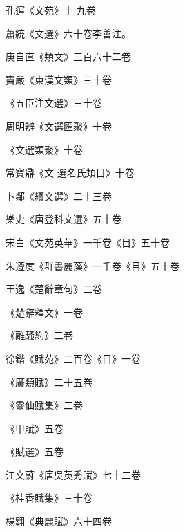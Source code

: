 
\begin{pinyinscope}

 孔逭《文苑》十
 九卷



 蕭統《文選》六十卷李善注。



 庚自直《類文》三百六十二卷



 竇嚴《東漢文類》三十卷



 《五臣注文選》三十卷



 周明辨《文選匯聚》十卷



 《文選類聚》十卷



 常寶鼎《文
 選名氏類目》十卷



 卜鄰《續文選》二十三卷



 樂史《唐登科文選》五十卷



 宋白《文苑英華》一千卷《目》五十卷



 朱遵度《群書麗藻》一千卷《目》五十卷



 王逸《楚辭章句》二卷



 《楚辭釋文》一卷



 《離騷約》二卷



 徐鍇《賦苑》二百卷《目》一卷



 《廣類賦》二十五卷



 《靈仙賦集》二卷



 《甲賦》五卷



 《賦選》五卷



 江文蔚《唐吳英秀賦》七十二卷



 《桂香賦集》三十卷



 楊翱《典麗賦》六十四卷




\end{pinyinscope}

